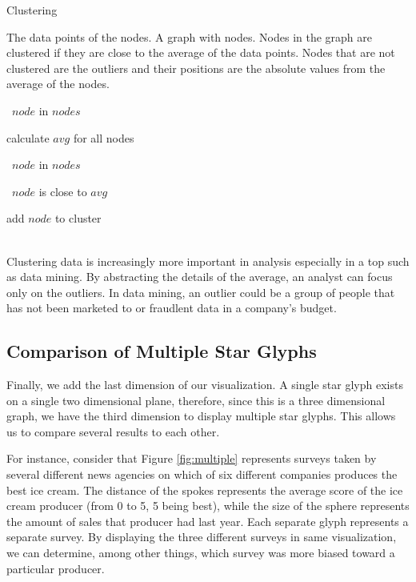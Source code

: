 \documentclass[]{article}
\begin{document}
\begin{Algorithm} {Clustering} {\sf
\vspace*{10pt}
 The data points of the nodes.
 A graph with nodes. Nodes in the graph are clustered if they are close to the average of the data points. Nodes that are not clustered are the outliers and their positions are the absolute values from the average of the nodes.
\vspace*{10pt}

\row  \cforeach\ $node$ in $nodes$
\begin{nested}
    calculate $avg$ for all nodes
\end{nested}
\row  \cforeach\ $node$ in $nodes$
\begin{nested}
\row \cif\ $node$ is close to $avg$
\begin{nested}
\row add $node$ to cluster
\end{nested}
\end{nested}

}
\end{Algorithm}
\\

Clustering data is increasingly more important in analysis especially in a top such as data mining. By abstracting the details of the average, an analyst can focus only on the outliers. In data mining, an outlier could be a group of people that has not been marketed to or fraudlent data in a company's budget.

\subsection{Comparison of Multiple Star Glyphs}
\label{ss:comparison}

Finally, we add the last dimension of our visualization.  A single star glyph exists on a single two dimensional plane, therefore, since this is a three dimensional graph, we have the third dimension to display multiple star glyphs.  This allows us to compare several results to each other.

For instance, consider that Figure \ref{fig:multiple} represents surveys taken by several different news agencies on which of six different companies produces the best ice cream.  The distance of the spokes represents the average score of the ice cream producer (from 0 to 5, 5 being best), while the size of the sphere represents the amount of sales that producer had last year.  Each separate glyph represents a separate survey.  By displaying the three different surveys in same visualization, we can determine, among other things, which survey was more biased toward a particular producer.
\end{document}

